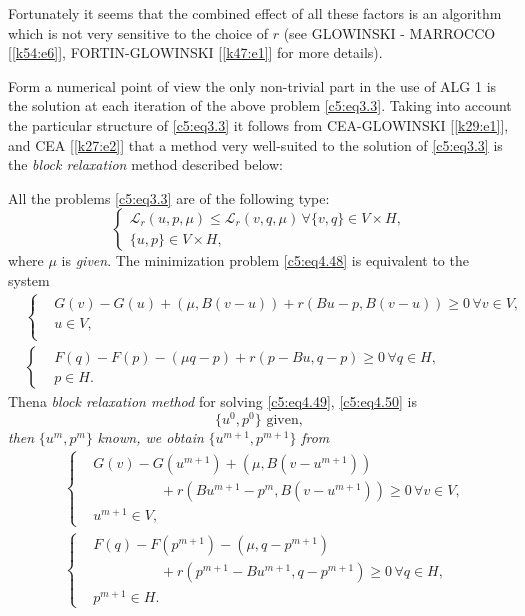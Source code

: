   Fortunately it seems that the combined effect of all these factors
  is an algorithm which is not very sensitive to the choice of $r$
  (see GLOWINSKI - MARROCCO [\ref{k54:e6}], FORTIN-GLOWINSKI
  [\ref{k47:e1}] for more details). 
  
  Form a numerical point of view the only non-trivial part in the use
  of ALG 1 is the solution at each iteration of the above problem
  \eqref{c5:eq3.3}. Taking into account the particular structure of
  \eqref{c5:eq3.3} it follows from CEA-GLOWINSKI [\ref{k29:e1}], and
  CEA [\ref{k27:e2}] that 
  a method very well-suited to the solution of \eqref{c5:eq3.3} is the
  \textit{block relaxation} method described below: 
  
  All the problems \eqref{c5:eq3.3} are of the following type:
  \begin{equation}
\begin{cases}
\mathscr{L}_r (u, p, \mu) \leq \mathscr{L}_r (v, q, \mu)\, \forall \{v,
q \} \in V \times H,\\ 
\{u, p \} \in V \times H, \tag{4.48}\label{c5:eq4.48}
\end{cases}
  \end{equation}
  where $\mu$ is \textit{given}. The minimization problem
  \eqref{c5:eq4.48} is equivalent to the system  
  \begin{align}
&\begin{cases}
&G (v) - G (u) + (\mu, B(v-u)) + r (Bu - p, B(v - u)) \geq 0\, \forall v \in V,\\
&u \in V,\tag{4.49}\label{c5:eq4.49}\\
\end{cases}\\
&\begin{cases}
&F(q) - F (p) -( \mu q-p) + r (p - Bu, q-p) \geq 0\, \forall q \in H,\\
&p \in H. \tag{4.50}\label{c5:eq4.50}
\end{cases}
 \end{align} 
 Then\pageoriginale  a \textit{block relaxation method} for solving \eqref{c5:eq4.49}, \eqref{c5:eq4.50} is 
 \begin{equation}
\{u^0, p^0 \} \text{ given}, \tag{4.51}\label{c5:eq4.51}
 \end{equation}
 \textit{then} $\{u^m, p^m \}$ \textit{known, we obtain} $\{u^{m+1}, p^{m+1} \}$ \textit{from}
 \begin{align}
&\begin{cases}
&G (v) - G(u^{m+1}) + (\mu, B (v-u^{m+1}))\\  
&\hspace{2cm}+ r(Bu^{m+1} - p^m, B (v-u^{m+1})) \geq 0\, \forall v \in V, \\
&u^{m+1} \in V, \tag{4.52}\label{c5:eq4.52}
\end{cases}\\
&\begin{cases}
&F(q) - F(p^{m+1}) - (\mu, q-p^{m+1})\\ 
& \hspace{2cm}+ r(p^{m+1} - Bu^{m+1}, q-p^{m+1}) \geq 0\, \forall q \in H,\\
&p^{m+1} \in H. \tag{4.53}\label{c5:eq4.53}
\end{cases}
\end{align} 

